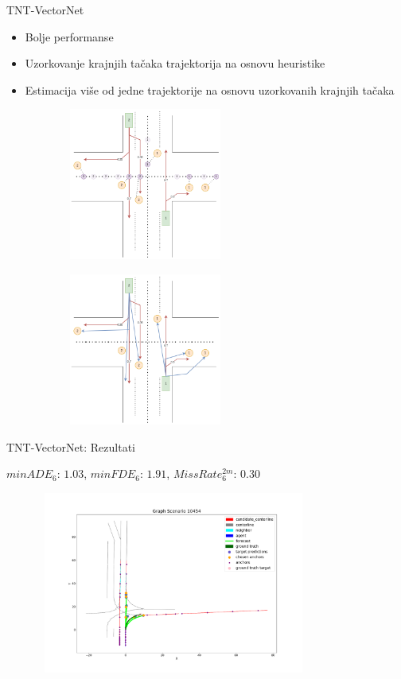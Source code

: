 \documentclass[bookmarks=true,bookmarksopen=true,pdfborder={0 0 0},pdfhighlight={/N},linkbordercolor={.5 .5 .5},implicit=false,unicode,xcolor={table}]{beamer}
\begin{document}
\begin{frame}{TNT-VectorNet}

  \begin{itemize}
    \item Bolje performanse
    \item Uzorkovanje krajnjih tačaka trajektorija na osnovu heuristike
    \item Estimacija više od jedne trajektorije na osnovu uzorkovanih krajnjih tačaka
  \end{itemize}

  \begin{figure}
		\begin{subfigure}{5cm}
			\includegraphics[width=5cm,height=5cm]{tnt-viz-Page-1.drawio.png}
		\end{subfigure}
    \hfill
    \begin{subfigure}{5cm}
			\includegraphics[width=5cm,height=5cm]{tnt-viz-Page-2.drawio.png}
		\end{subfigure}
	\end{figure}
  
\end{frame}

\begin{frame}{TNT-VectorNet: Rezultati}
  \centerline{$minADE_{6}$: $1.03$, $minFDE_{6}$: $1.91$, $MissRate^{2m}_{6}$: $0.30$}

  \begin{figure}
		\includegraphics[width=9cm,height=6cm]{result_MIA_10454.png}
	\end{figure}
  
\end{frame}
\end{document}
